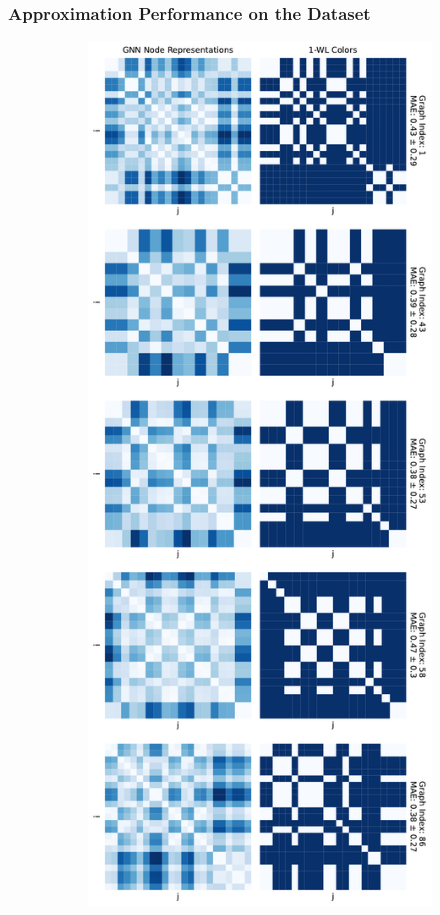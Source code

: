 \subsubsection{Approximation Performance on the \mutag Dataset}
\begin{figure}[H]
    \centering
    \begin{subfigure}[b]{0.45992852703\textwidth}
        \centering
        \includegraphics[width=\textwidth, left]{Figures/heatmaps_MUTAG_0.pdf}

\end{subfigure}
\end{figure}
